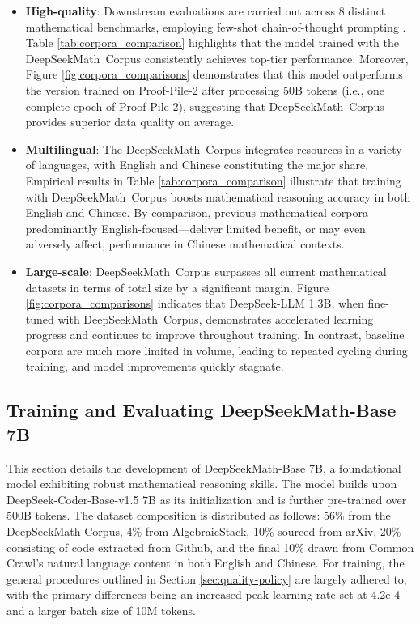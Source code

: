 \begin{itemize}[topsep=0pt]
    \item \textbf{High-quality}:
    Downstream evaluations are carried out across 8 distinct mathematical benchmarks, employing few-shot chain-of-thought prompting \cite{cot}. Table \ref{tab:corpora_comparison} highlights that the model trained with the DeepSeekMath~Corpus consistently achieves top-tier performance. Moreover, Figure \ref{fig:corpora_comparisons} demonstrates that this model outperforms the version trained on Proof-Pile-2 after processing 50B tokens (i.e., one complete epoch of Proof-Pile-2), suggesting that DeepSeekMath~Corpus provides superior data quality on average.
    \item \textbf{Multilingual}:
    The DeepSeekMath~Corpus integrates resources in a variety of languages, with English and Chinese constituting the major share. Empirical results in Table \ref{tab:corpora_comparison} illustrate that training with DeepSeekMath~Corpus boosts mathematical reasoning accuracy in both English and Chinese. By comparison, previous mathematical corpora—predominantly English-focused—deliver limited benefit, or may even adversely affect, performance in Chinese mathematical contexts.
    \item \textbf{Large-scale}:
    DeepSeekMath~Corpus surpasses all current mathematical datasets in terms of total size by a significant margin. Figure \ref{fig:corpora_comparisons} indicates that DeepSeek-LLM 1.3B, when fine-tuned with DeepSeekMath~Corpus, demonstrates accelerated learning progress and continues to improve throughout training. In contrast, baseline corpora are much more limited in volume, leading to repeated cycling during training, and model improvements quickly stagnate.
\end{itemize}

\subsection{Training and Evaluating DeepSeekMath-Base 7B}

This section details the development of DeepSeekMath-Base 7B, a foundational model exhibiting robust mathematical reasoning skills. The model builds upon DeepSeek-Coder-Base-v1.5 7B \citep{deepseek-coder} as its initialization and is further pre-trained over 500B tokens. The dataset composition is distributed as follows: 56\% from the DeepSeekMath Corpus, 4\% from AlgebraicStack, 10\% sourced from arXiv, 20\% consisting of code extracted from Github, and the final 10\% drawn from Common Crawl’s natural language content in both English and Chinese. For training, the general procedures outlined in Section \ref{sec:quality-policy} are largely adhered to, with the primary differences being an increased peak learning rate set at 4.2e-4 and a larger batch size of 10M tokens.

